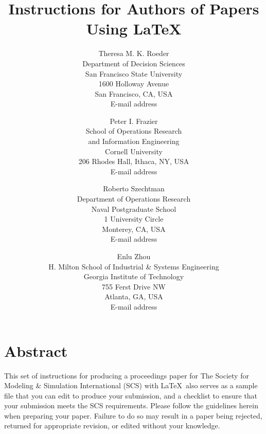 \documentclass{scspaperproc}
\theoremstyle{scsthe}
\begin{document}
\title{Instructions for Authors of Papers Using \LaTeX}

\author{Theresa M. K. Roeder \\ [12pt]
Department of Decision Sciences \\
San Francisco State University \\
1600 Holloway Avenue \\
San Francisco, CA, USA \\
E-mail address \\
\and
Peter I. Frazier \\[12pt]
School of Operations Research \\ and Information Engineering \\
Cornell University \\
206 Rhodes Hall, Ithaca, NY, USA \\
E-mail address \\
\and
Roberto Szechtman \\ [12pt]
Department of Operations Research \\
Naval Postgraduate School \\
1 University Circle \\
Monterey, CA, USA \\
E-mail address \\
\and
Enlu Zhou \\ [12pt]
H. Milton School of Industrial \& Systems Engineering \\
Georgia Institute of Technology \\
755 Ferst Drive NW \\
Atlanta, GA, USA \\
E-mail address
}

\maketitle

\section*{Abstract}

This set of instructions for producing a proceedings paper for The Society for Modeling \& Simulation International (SCS) with \LaTeX\ also serves as a sample file that you can edit to produce your submission, and a checklist to ensure that your submission meets the SCS requirements. Please follow the guidelines herein when preparing your paper. Failure to do so may result in a paper being rejected, returned for appropriate revision, or edited without your knowledge.
\end{document}
